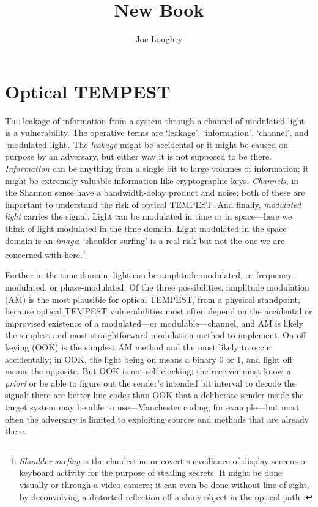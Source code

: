 \documentclass[a4paper,twoside,11pt]{book}
\begin{document}
\title{New Book}
\author{Joe Loughry}
\setcounter{chapter}{6} %
\setcounter{page}{262} %
\thispagestyle{empty}
\chapter{Optical TEMPEST}
\lettrine[lines=3]{T}{he} leakage of information from a system through a
channel of modulated light is a vulnerability. The operative terms are `leakage',
`information', `channel', and `modulated light'. The \emph{leakage} might be
accidental or it might be caused on purpose by an adversary, but either way it
is not
supposed to be there. \emph{Information} can be anything from a single bit to
large volumes of information; it might be extremely valuable information like
cryptographic keys. \emph{Channels}, in the Shannon sense \cite{Shannon1948}
have a bandwidth-delay product and noise; both of these are important to
understand the risk of optical TEMPEST. And finally, \emph{modulated light}
carries the signal. Light can be modulated in time or in space---here we think of
light modulated in the time domain. Light modulated in the space domain is an
\emph{image}; `shoulder surfing' is a real risk but not the one we are
concerned with here.\footnote{\emph{Shoulder surfing} is the clandestine or
covert
surveillance of display screens or keyboard activity for the purpose of
stealing secrets. It might be done visually or through a video camera; it can
even be done without line-of-sight, by deconvolving a distorted reflection off
a shiny object in the optical path
\cite{Backes2008,Backes2009a,Raguram2011,Jenkins2013a,Xu2013a}.}

Further in the time domain, light can be amplitude-modulated, or
frequency-modulated, or phase-modulated. Of the three possibilities, amplitude
modulation (AM) is the most plausible for optical TEMPEST, from a physical
standpoint, because optical TEMPEST vulnerabilities most often depend on the
accidental or improvised existence of a modulated---or modulable---channel,
and AM is likely the simplest and most straightforward modulation method to
implement. On-off
keying (OOK) is the simplest AM method and the most likely to occur
accidentally; in OOK, the light being on means a binary 0 or 1, and light
off means the opposite. But OOK is not self-clocking: the receiver must
know {\it a priori} or be able to figure out the sender's intended bit
interval to decode the signal; there are better line codes than OOK
that a deliberate sender inside the target system may be able to
use---Manchester coding, for example---but most often the adversary is limited
to exploiting sources and methods that are already there.
\end{document}
